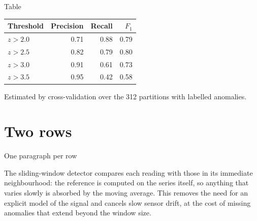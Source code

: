 \documentclass[aspectratio=169,9pt]{beamer}
\begin{document}
\begin{frame}{Table}

  \begin{tabular}{@{}lrrr@{}}
    \toprule
    Threshold     & Precision & Recall & $F_1$ \\
    \midrule
    $z > 2.0$     & 0.71  & 0.88  & 0.79 \\
    $z > 2.5$     & 0.82  & 0.79  & 0.80 \\
    $z > 3.0$     & 0.91  & 0.61  & 0.73 \\
    $z > 3.5$     & 0.95  & 0.42  & 0.58 \\
    \bottomrule
  \end{tabular}

  Estimated by cross-validation over the 312 partitions with labelled
  anomalies.
\end{frame}

\section{Two rows}

\begin{frame}{One paragraph per row}
\begin{tworows}
  The sliding-window detector compares each reading with those in its
  immediate neighbourhood: the reference is computed on the series itself,
  so anything that varies slowly is absorbed by the moving average.
\nextrow
  This removes the need for an explicit model of the signal and cancels
  slow sensor drift, at the cost of missing anomalies that extend beyond
  the window size.
\end{tworows}
\end{frame}
\end{document}
